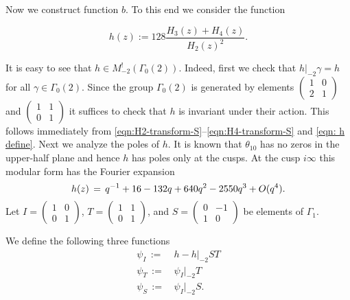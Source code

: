 Now we construct function $b$. To this end we consider the function
\begin{definition}\label{def: h}
\begin{equation}\label{eqn: h define}
    h(z) := 128 \frac{H_3(z) + H_4(z)}{H_2(z)^2}.
\end{equation}
\end{definition}
It is easy to see that $h\in M^!_{-2}(\Gamma_0(2))$. Indeed, first we check that $h|_{-2}\gamma=h$
for all $\gamma\in\Gamma_0(2)$. Since the group $\Gamma_0(2)$ is generated by elements
$\left(\begin{smallmatrix}1&0\\2&1\end{smallmatrix}\right)$ and $\left(\begin{smallmatrix}1&1\\0&1\end{smallmatrix}\right)$
it suffices to check that $h$ is invariant under their action. This follows immediately
from \eqref{eqn:H2-transform-S}--\eqref{eqn:H4-transform-S} and \eqref{eqn: h define}. Next we analyze the poles of $h$.
It is known \cite[Chapter~I Lemma~4.1]{Mumford} that $\theta_{10}$ has no zeros in the upper-half plane and hence $h$ has poles only at the cusps.
At the cusp $i\infty$ this modular form has the Fourier expansion
\begin{equation}
h(z)\,=\,q^{-1} + 16 - 132 q + 640 q^2 - 2550 q^3+O(q^4).\notag
\end{equation}
Let $I=\left(\begin{smallmatrix}1&0\\0&1\end{smallmatrix}\right)$,
$T=\left(\begin{smallmatrix}1&1\\0&1\end{smallmatrix}\right)$, and
$S=\left(\begin{smallmatrix}0&-1\\1&0\end{smallmatrix}\right)$ be elements of $\Gamma_1$.
\begin{definition}\label{def:psiI-psiT-psiS}
We define the following three functions
\begin{align}
    \psi_I\,:=\,&h-h|_{-2}ST \label{eqn:psiI-define}\\
    \psi_T\,:=\,&\psi_I|_{-2}T \label{eqn:psiT-define}\\
    \psi_S\,:=\,&\psi_I|_{-2}S. \label{eqn:psiS-define}
\end{align}
\end{definition}
